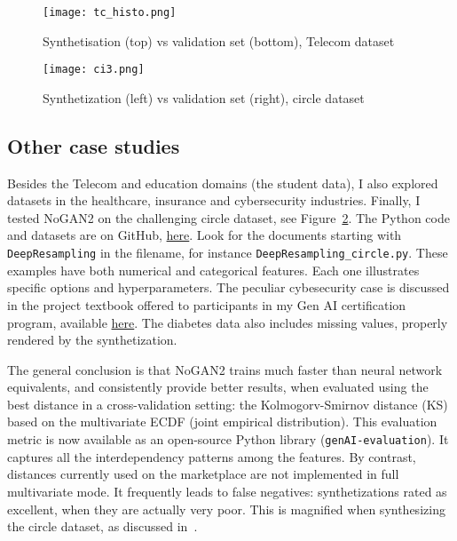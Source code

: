 \documentclass[oneside,10pt]{book}
\begin{document}
\begin{figure}[H]
\centering
\texttt{[image: tc\_histo.png]} %
\caption{Synthetisation (top) vs validation set (bottom), Telecom dataset}
\label{fig:nogrdf2abc}
\end{figure}

\begin{figure}[H]
\centering
\texttt{[image: ci3.png]} %
\caption{Synthetization (left) vs validation set (right), circle dataset}
\label{fig:nohhys0oabc}
\end{figure}

\subsection{Other case studies}

Besides the Telecom and education domains (the student data), I also explored datasets in the healthcare, insurance and cybersecurity industries. Finally,  I tested NoGAN2 on the challenging circle dataset, see Figure~\ref{fig:nohhys0oabc}. The Python code and datasets are on GitHub,
 \href{https://github.com/VincentGranville/Main}{here}. Look for the documents starting with \texttt{DeepResampling} in the filename, for
 instance \texttt{DeepResampling\_circle.py}. These examples have both numerical and categorical features. Each one illustrates specific options
 and hyperparameters. The peculiar cybesecurity case is discussed in the project textbook offered to participants in my
Gen AI certification program, available \href{https://mltblog.com/3pWxvZK}{here}. The diabetes data also includes missing values, properly rendered by the synthetization.



The general conclusion is that NoGAN2 trains much faster than neural network equivalents, and consistently provide better results, when evaluated using the best distance in a cross-validation setting: the Kolmogorv-Smirnov distance (KS) based on the multivariate ECDF (joint empirical distribution). This evaluation metric is now available as an open-source Python library (\texttt{genAI-evaluation}). It captures all the interdependency patterns among the features. By contrast, distances currently used on the marketplace are not implemented in full multivariate mode. It frequently leads to false negatives: synthetizations rated as excellent, when they are actually very poor. This is magnified when synthesizing the circle dataset, as discussed in~\cite{vgvendors}.
\end{document}
